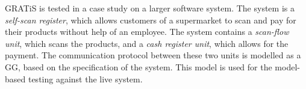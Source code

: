 GRATiS is tested in a case study on a larger software system. The system is a \textit{self-scan register}, which allows customers of a supermarket to scan and pay for their products without help of an employee. The system contains a \textit{scan-flow unit}, which scans the products, and a \textit{cash register unit}, which allows for the payment. The communication protocol between these two units is modelled as a GG, based on the specification of the system. This model is used for the model-based testing against the live system.
